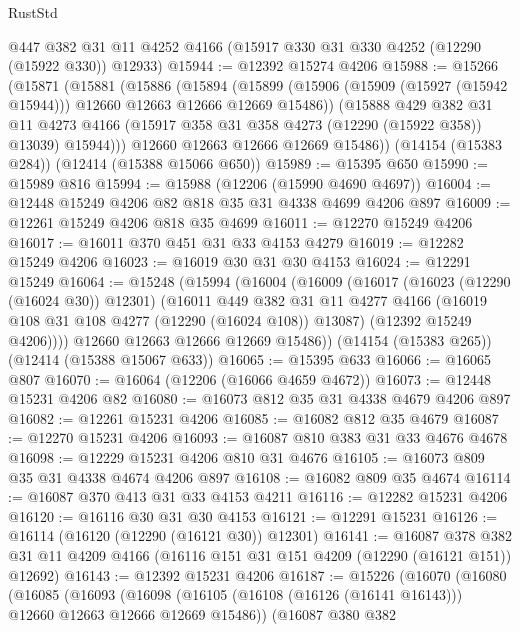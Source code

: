 \begin{lexlean}{RustStd}
\begin{coremodule}
    @447
    @382
    @31
    @11
    @4252
    @4166
    (@15917 @330 @31 @330 @4252 (@12290 (@15922 @330)) @12933)
@15944 := @12392 @15274 @4206
@15988 := @15266
    (@15871
      (@15881
        (@15886
          (@15894
            (@15899 (@15906 (@15909 (@15927 (@15942 @15944))) @12660 @12663 @12666 @12669 @15486))
            (@15888
              @429
              @382
              @31
              @11
              @4273
              @4166
              (@15917 @358 @31 @358 @4273 (@12290 (@15922 @358)) @13039)
              @15944)))
        @12660
        @12663
        @12666
        @12669
        @15486))
    (@14154 (@15383 @284))
    (@12414 (@15388 @15066 @650))
@15989 := @15395 @650
@15990 := @15989 @816
@15994 := @15988 (@12206 (@15990 @4690 @4697))
@16004 := @12448 @15249 @4206 @82 @818 @35 @31 @4338 @4699 @4206 @897
@16009 := @12261 @15249 @4206 @818 @35 @4699
@16011 := @12270 @15249 @4206
@16017 := @16011 @370 @451 @31 @33 @4153 @4279
@16019 := @12282 @15249 @4206
@16023 := @16019 @30 @31 @30 @4153
@16024 := @12291 @15249
@16064 := @15248
    (@15994
      (@16004
        (@16009
          (@16017
            (@16023 (@12290 (@16024 @30)) @12301)
            (@16011
              @449
              @382
              @31
              @11
              @4277
              @4166
              (@16019 @108 @31 @108 @4277 (@12290 (@16024 @108)) @13087)
              (@12392 @15249 @4206))))
        @12660
        @12663
        @12666
        @12669
        @15486))
    (@14154 (@15383 @265))
    (@12414 (@15388 @15067 @633))
@16065 := @15395 @633
@16066 := @16065 @807
@16070 := @16064 (@12206 (@16066 @4659 @4672))
@16073 := @12448 @15231 @4206 @82
@16080 := @16073 @812 @35 @31 @4338 @4679 @4206 @897
@16082 := @12261 @15231 @4206
@16085 := @16082 @812 @35 @4679
@16087 := @12270 @15231 @4206
@16093 := @16087 @810 @383 @31 @33 @4676 @4678
@16098 := @12229 @15231 @4206 @810 @31 @4676
@16105 := @16073 @809 @35 @31 @4338 @4674 @4206 @897
@16108 := @16082 @809 @35 @4674
@16114 := @16087 @370 @413 @31 @33 @4153 @4211
@16116 := @12282 @15231 @4206
@16120 := @16116 @30 @31 @30 @4153
@16121 := @12291 @15231
@16126 := @16114 (@16120 (@12290 (@16121 @30)) @12301)
@16141 := @16087
    @378
    @382
    @31
    @11
    @4209
    @4166
    (@16116 @151 @31 @151 @4209 (@12290 (@16121 @151)) @12692)
@16143 := @12392 @15231 @4206
@16187 := @15226
    (@16070
      (@16080
        (@16085
          (@16093
            (@16098 (@16105 (@16108 (@16126 (@16141 @16143))) @12660 @12663 @12666 @12669 @15486))
            (@16087
              @380
              @382

\end{coremodule}
\end{lexlean}
